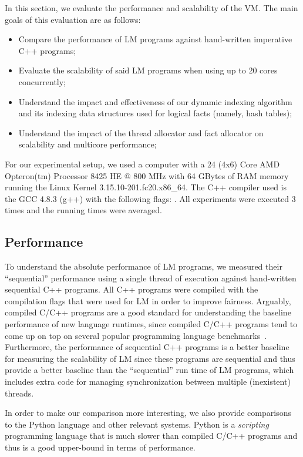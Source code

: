 In this section, we evaluate the performance and scalability of the VM. The main
goals of this evaluation are as follows:

\begin{itemize}
   \item Compare the performance of LM programs against hand-written
      imperative C++ programs;
   \item Evaluate the scalability of said LM programs when using up to 20 cores
      concurrently;
   \item Understand the impact and effectiveness of our dynamic indexing
      algorithm and its indexing data structures used for logical facts (namely,
      hash tables);
   \item Understand the impact of the thread allocator and fact allocator on scalability and
      multicore performance;
\end{itemize}

For our experimental setup, we used a computer with a 24 (4x6) Core AMD
Opteron(tm) Processor 8425 HE $@$ 800 MHz with 64 GBytes of RAM memory running
the Linux Kernel 3.15.10-201.fc20.x86\_64. The C++ compiler used is the GCC
4.8.3 (g++) with the following  flags: .  All experiments were executed 3 times and the running times
were averaged.

\subsection{Performance}

To understand the absolute performance of LM programs, we measured their
``sequential'' performance using a single thread of execution against
hand-written sequential C++ programs. All C++ programs were compiled with the
compilation flags that were used for LM in order to improve fairness. Arguably,
compiled C/C++ programs are a good standard for understanding the baseline
performance of new language runtimes, since compiled C/C++ programs tend to come
up on top on several popular programming language
benchmarks~\cite{language_benchmarks}.  Furthermore, the performance of
sequential C++ programs is a better baseline for measuring the scalability of LM
since these programs are sequential and thus provide a better baseline than the
``sequential'' run time of LM programs, which includes extra code for managing
synchronization between multiple (inexistent) threads.

In order to make our comparison more interesting, we also provide comparisons to
the Python language and other relevant systems. Python is a \emph{scripting}
programming language that is much slower than compiled C/C++ programs and thus
is a good upper-bound in terms of performance.

